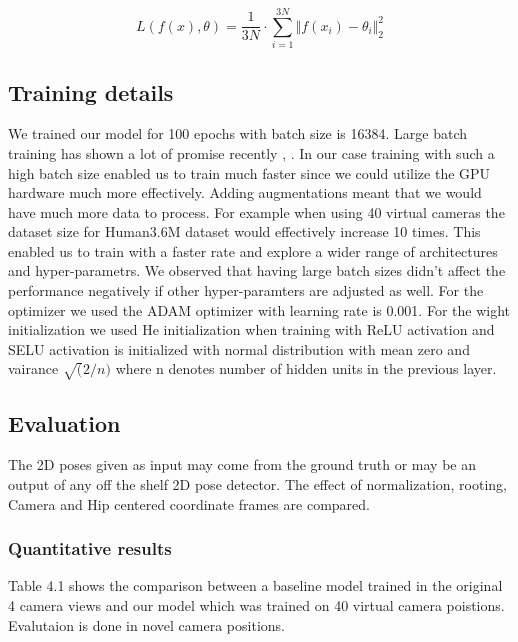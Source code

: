 \begin{equation}	
    L(f(x),\theta) = \frac{1}{3N} \cdot \sum_{i=1}^{3N} {\Vert f(x_i)-\theta_i \Vert}_2^2
\end{equation}


\subsection{Training details}

We trained our model for 100 epochs with batch size is 16384. Large batch training has shown a lot of promise recently \parencite{you2017imagenet}, \parencite{goyal2017accurate}. In our case training with such a high batch size enabled us to train much faster since we could utilize the GPU hardware much more effectively. Adding augmentations meant that we would have much more data to process. For example when using 40 virtual cameras the dataset size for Human3.6M dataset would effectively increase 10 times. This enabled us to train with a faster rate and explore a wider range of architectures and hyper-parametrs. We observed that having large batch sizes didn't affect the performance negatively if other hyper-paramters are adjusted as well. For the optimizer we used the ADAM optimizer with learning rate is 0.001. For the wight initialization we used He initialization when training with ReLU activation and SELU activation is initialized with normal distribution with mean zero and vairance $\sqrt(2 / n)$ where n denotes number of hidden units in the previous layer. 

\subsection{Evaluation}

The 2D poses given as input may come from the ground truth or may be an output of any off the shelf 2D pose detector. The effect of normalization, rooting, Camera and Hip centered coordinate frames are compared. 

\subsubsection{Quantitative results}

Table 4.1 shows the comparison between a baseline model trained in the original 4 camera views and our model which was trained on 40 virtual camera poistions. Evalutaion is done in novel camera positions.

